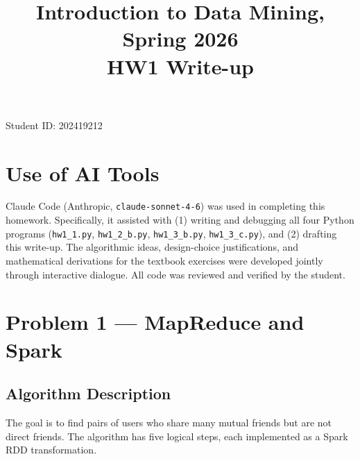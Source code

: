 \documentclass[11pt,a4paper]{article}
\title{\textbf{Introduction to Data Mining, Spring 2026}\\[4pt]
       \Large HW1 Write-up}
\author{}
\date{}
\begin{document}
\maketitle
\vspace{-3em}
\noindent Student ID: 202419212
\bigskip

\section*{Use of AI Tools}

Claude Code (Anthropic, \texttt{claude-sonnet-4-6}) was used in completing this homework.
Specifically, it assisted with (1) writing and debugging all four Python programs
(\texttt{hw1\_1.py}, \texttt{hw1\_2\_b.py}, \texttt{hw1\_3\_b.py}, \texttt{hw1\_3\_c.py}),
and (2) drafting this write-up.
The algorithmic ideas, design-choice justifications, and mathematical derivations for
the textbook exercises were developed jointly through interactive dialogue.
All code was reviewed and verified by the student.

\section{Problem 1 — MapReduce and Spark}

\subsection*{Algorithm Description}

The goal is to find pairs of users who share many mutual friends but are not
direct friends.
The algorithm has five logical steps, each implemented as a Spark RDD transformation.
\end{document}

